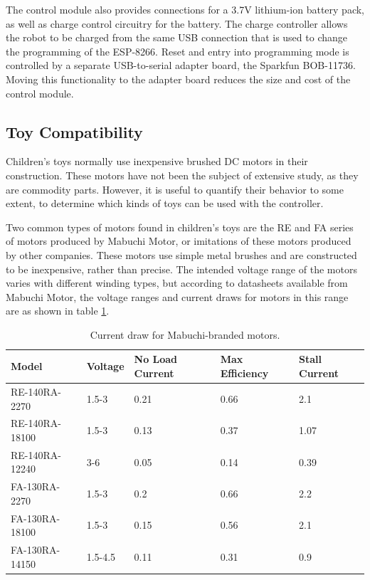 The control module also provides connections for a 3.7V lithium-ion battery pack, as well as charge control circuitry for the battery. 
The charge controller allows the robot to be charged from the same USB connection that is used to change the programming of the ESP-8266. 
Reset and entry into programming mode is controlled by a separate USB-to-serial adapter board, the Sparkfun BOB-11736.
Moving this functionality to the adapter board reduces the size and cost of the control module. 

\subsection{Toy Compatibility} \label{section:Toy_Compatibility}

Children's toys normally use inexpensive brushed DC motors in their construction. 
These motors have not been the subject of extensive study, as they are commodity parts. 
However, it is useful to quantify their behavior to some extent, to determine which kinds of toys can be used with the controller. 

Two common types of motors found in children's toys are the RE and FA series of motors produced by Mabuchi Motor, or imitations of these motors produced by other companies. 
These motors use simple metal brushes and are constructed to be inexpensive, rather than precise. 
The intended voltage range of the motors varies with different winding types, but according to datasheets available from Mabuchi Motor, the voltage ranges and current draws for motors in this range are as shown in table \ref{tab:properBrandedMotors}.

\begin{table}
	\begin{tabular}{l l l l l}
		Model & Voltage & No Load Current & Max Efficiency & Stall Current\\
		\hline
		RE-140RA-2270 & 1.5-3 & 0.21 & 0.66 & 2.1 \\
		RE-140RA-18100 & 1.5-3 & 0.13 & 0.37 & 1.07 \\
		RE-140RA-12240 & 3-6 & 0.05 & 0.14 & 0.39 \\
		FA-130RA-2270 & 1.5-3 & 0.2 & 0.66 & 2.2\\
		FA-130RA-18100 & 1.5-3 & 0.15 & 0.56 & 2.1\\
		FA-130RA-14150 & 1.5-4.5 & 0.11 & 0.31 & 0.9\\
	\end{tabular}
	\caption{Current draw for Mabuchi-branded motors.}
	\label{tab:properBrandedMotors}
\end{table}

